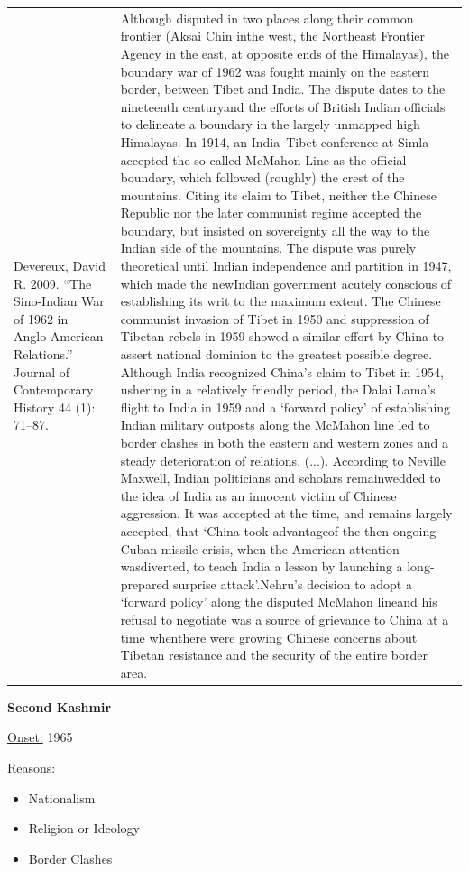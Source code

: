 {\begin{longtable}{p{}p{}}
Devereux, David R. 2009. “The Sino-Indian War of 1962 in Anglo-American Relations.” Journal of Contemporary History 44 (1): 71–87. & Although disputed in two places along their common frontier (Aksai Chin inthe west, the Northeast Frontier Agency in the east, at opposite ends of the Himalayas), the boundary war of 1962 was fought mainly on the eastern border, between Tibet and India. The dispute dates to the nineteenth centuryand the efforts of British Indian officials to delineate a boundary in the largely unmapped high Himalayas. In 1914, an India–Tibet conference at Simla accepted the so-called McMahon Line as the official boundary, which followed (roughly) the crest of the mountains. Citing its claim to Tibet, neither the Chinese Republic nor the later communist regime accepted the boundary, but insisted on sovereignty all the way to the Indian side of the mountains. The dispute was purely theoretical until Indian independence and partition in 1947, which made the newIndian government acutely conscious of establishing its writ to the maximum extent. The Chinese communist invasion of Tibet in 1950 and suppression of Tibetan rebels in 1959 showed a similar effort by China to assert national dominion to the greatest possible degree. Although India recognized China's claim to Tibet in 1954, ushering in a relatively friendly period, the Dalai Lama's flight to India in 1959 and a ‘forward policy' of establishing Indian military outposts along the McMahon line led to border clashes in both the eastern and western zones and a steady deterioration of relations. (...).  
According to Neville Maxwell, Indian politicians and scholars remainwedded to the idea of India as an innocent victim of Chinese aggression. It was accepted at the time, and remains largely accepted, that ‘China took advantageof the then ongoing Cuban missile crisis, when the American attention wasdiverted, to teach India a lesson by launching a long-prepared surprise attack'.Nehru's decision to adopt a ‘forward policy' along the disputed McMahon lineand his refusal to negotiate was a source of grievance to China at a time whenthere were growing Chinese concerns about Tibetan resistance and the security of the entire border area.
\\
\end{longtable}}
\clearpage
         \textbf{Second Kashmir} 

          \underline{Onset:} 1965         

\underline{Reasons:}
\begin{itemize}
\item Nationalism
\item Religion or Ideology
\item Border Clashes
\end{itemize}

